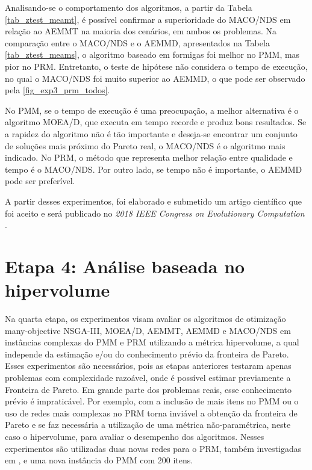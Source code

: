 Analisando-se o comportamento dos algoritmos, a partir da Tabela \ref{tab_ztest_meamt}, é possível confirmar a superioridade do MACO/NDS em relação ao AEMMT na maioria dos cenários, em ambos os problemas. Na comparação entre o MACO/NDS e o AEMMD, apresentados na Tabela \ref{tab_ztest_meams}, o algoritmo baseado em formigas foi melhor no PMM, mas pior no PRM. Entretanto, o teste de hipótese não considera o tempo de execução, no qual o MACO/NDS foi muito superior ao AEMMD, o que pode ser observado pela \autoref{fig_exp3_prm_todos}.

No PMM, se o tempo de execução é uma preocupação, a melhor alternativa é o algoritmo MOEA/D, que executa em tempo recorde e produz bons resultados. Se a rapidez do algoritmo não é tão importante e deseja-se encontrar um conjunto de soluções mais próximo do Pareto real, o MACO/NDS é o algoritmo mais indicado. No PRM, o método que representa melhor relação entre qualidade e tempo é o MACO/NDS. Por outro lado, se tempo não é importante, o AEMMD pode ser preferível.

A partir desses experimentos, foi elaborado e submetido um artigo científico que foi aceito e será publicado no \textit{2018 IEEE Congress on Evolutionary Computation} \cite{Franca2018}.

\section{Etapa 4: Análise baseada no hipervolume}
\label{section_experimentos_etapa4}

Na quarta etapa, os experimentos visam avaliar os algoritmos de otimização many-objective NSGA-III, MOEA/D, AEMMT, AEMMD e MACO/NDS em instâncias complexas do PMM e PRM utilizando a métrica hipervolume, a qual independe da estimação e/ou do conhecimento prévio da fronteira de Pareto. Esses experimentos são necessários, pois as etapas anteriores testaram apenas problemas com complexidade razoável, onde é possível estimar previamente a Fronteira de Pareto. Em grande parte dos problemas reais, esse conhecimento prévio é impraticável. Por exemplo, com a inclusão de mais itens no PMM ou o uso de redes mais complexas no PRM torna inviável a obtenção da fronteira de Pareto e se faz necessária a utilização de uma métrica não-paramétrica, neste caso o hipervolume, para avaliar o desempenho dos algoritmos. Nesses experimentos são utilizadas duas novas redes para o PRM, também investigadas em \cite{LafetaThesis}, e uma nova instância do PMM com 200 itens.

